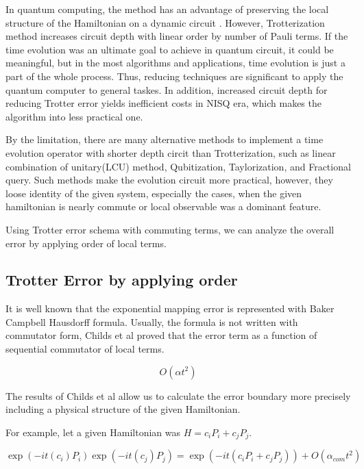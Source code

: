 \documentclass[a4paper,12pt]{article}
\begin{document}
In quantum computing, the method has an advantage of preserving the local structure of 
the Hamiltonian on a dynamic circuit \cite{childs_theory_2021}.
However, Trotterization method increases circuit depth with linear order by number of Pauli terms.
If the time evolution was an ultimate goal to achieve in quantum circuit, 
it could be meaningful, but in the most algorithms and applications, time evolution 
is just a part of the whole process. 
Thus, reducing techniques are significant to apply the quantum computer to general taskes.
In addition, increased circuit depth for reducing Trotter error yields 
inefficient costs in NISQ era, which makes the algorithm into less practical one.

By the limitation, there are many alternative methods to implement a time evolution operator 
with shorter depth circit than Trotterization, such as 
linear combination of unitary(LCU) method\cite{dewolf2023quantumcomputinglecturenotes}, Qubitization\cite{Low_2019}, 
Taylorization\cite{PhysRevLett.114.090502}, and Fractional query\cite{Berry_2014}.
Such methods make the evolution circuit more practical, however, they loose 
identity of the given system, especially the cases, when the given hamiltonian is nearly commute
or local observable was a dominant feature\cite{childs_theory_2021}. 

Using Trotter error schema with commuting terms, 
we can analyze the overall error by applying order of local terms.


\subsection{Trotter Error by applying order}

It is well known that the exponential mapping error is represented with Baker Campbell Hausdorff formula.
Usually, the formula is not written with commutator form, Childs et al proved that the error term 
as a function of sequential commutator of local terms.%

\begin{equation}
    O(\alpha t^2)
\end{equation}

The results of Childs et al allow us to calculate 
the error boundary more precisely including a physical structure 
of the given Hamiltonian.

For example, let a given Hamiltonian was $H = c_i P_i + c_j P_j$.

\begin{equation}
    \exp(-it (c_i) P_i) \exp(-it (c_j) P_j) = \exp(- it (c_i P_i + c_j P_j)) + O (\alpha_{com}t^2)
\end{equation}
\end{document}
